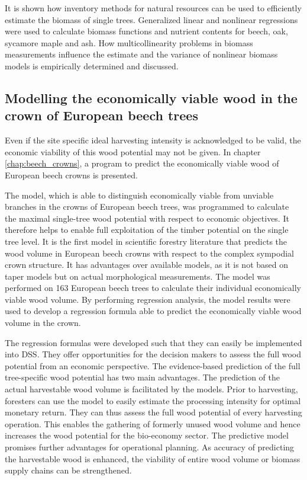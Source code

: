 It is shown how inventory methods for natural resources can be used to efficiently estimate the biomass of single trees. Generalized linear and nonlinear regressions were used to calculate biomass functions and nutrient contents for beech, oak, sycamore maple and ash. How multicollinearity problems in biomass measurements influence the estimate and the variance of nonlinear biomass models is empirically determined and discussed.

\subsection{Modelling the economically viable wood in the crown of European beech trees}
\label{subsec:intro:struct:beech_crowns}
Even if the site specific ideal harvesting intensity is acknowledged to be valid, the economic viability of this wood potential may not be given. In chapter \ref{chap:beech_crowns}, a program to predict the economically viable wood of European beech crowns is presented.

The model, which is able to distinguish economically viable from unviable branches in the crowns of European beech trees, was programmed to calculate the maximal single-tree wood potential with respect to economic objectives. It therefore helps to enable full exploitation of the timber potential on the single tree level. It is the first model in scientific forestry literature that predicts the wood volume in European beech crowns with respect to the complex sympodial crown structure. It has advantages over available models, as it is not based on taper models but on actual morphological measurements. The model was performed on 163 European beech trees to calculate their individual economically viable wood volume. By performing regression analysis, the model results were used to develop a regression formula able to predict the economically viable wood volume in the crown.

The regression formulas were developed such that they can easily be implemented into DSS. They offer opportunities for the decision makers to assess the full wood potential from an economic perspective. The evidence-based prediction of the full tree-specific wood potential has two main advantages. The prediction of the actual harvestable wood volume is facilitated by the models. Prior to harvesting, foresters can use the model to easily estimate the processing intensity for optimal monetary return. They can thus assess the full wood potential of every harvesting operation. This enables the gathering of formerly unused wood volume and hence increases the wood potential for the bio-economy sector. The predictive model promises further advantages for operational planning. As accuracy of predicting the harvestable wood is enhanced, the viability of entire wood volume or biomass supply chains can be strengthened.

